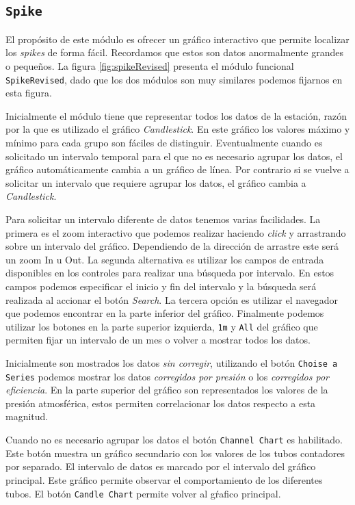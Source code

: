 	\subsection{\texttt{Spike}}
		El propósito de este módulo es ofrecer un gráfico interactivo que permite localizar los \emph{spikes} de forma fácil. Recordamos
		que estos son datos anormalmente grandes o pequeños. La figura \ref{fig:spikeRevised} presenta el módulo funcional
		\texttt{SpikeRevised}, dado que los dos módulos son muy similares podemos fijarnos en esta figura.
		\par
		Inicialmente el módulo tiene que representar todos los datos de la estación, razón por la que es utilizado el gráfico
		\emph{Candlestick}. En este gráfico los valores máximo y mínimo para cada grupo son fáciles de distinguir. Eventualmente cuando es
		solicitado un intervalo temporal para el que no es necesario agrupar los datos, el gráfico automáticamente cambia a un gráfico de
		línea. Por contrario si se vuelve a solicitar un intervalo que requiere agrupar los datos, el gráfico cambia a \emph{Candlestick}.
		\par
		Para solicitar un intervalo diferente de datos tenemos varias facilidades. La primera es el zoom interactivo que podemos realizar
		haciendo \emph{click} y arrastrando sobre un intervalo del gráfico. Dependiendo de la dirección de arrastre este será un zoom In u
		Out. La segunda alternativa es utilizar los campos de entrada disponibles en los controles para realizar una búsqueda por intervalo.
		En estos campos podemos especificar el inicio y fin del intervalo y la búsqueda será realizada al accionar el botón \emph{Search}. La
		tercera opción es utilizar el navegador que podemos encontrar en la parte inferior del gráfico. Finalmente podemos utilizar los
		botones en la parte superior izquierda, \texttt{1m} y \texttt{All} del gráfico que permiten fijar un intervalo de un mes o volver a
		mostrar todos los datos.
		\par
		Inicialmente son mostrados los datos \emph{sin corregir}, utilizando el botón \texttt{Choise a Series} podemos mostrar los datos
		\emph{corregidos por presión} o los \emph{corregidos por eficiencia}. En la parte superior del gráfico son representados los valores
		de la presión atmosférica, estos permiten correlacionar los datos respecto a esta magnitud.
		\par
		Cuando no es necesario agrupar los datos el botón \texttt{Channel Chart} es habilitado. Este botón muestra un gráfico secundario con
		los valores de los tubos contadores por separado. El intervalo de datos es marcado por el intervalo del gráfico principal. Este
		gráfico permite observar el comportamiento de los diferentes tubos. El botón \texttt{Candle Chart} permite volver al gŕafico
		principal.
